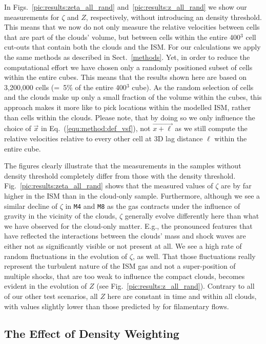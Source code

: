 In Figs.~\ref{pic:results:zeta_all_rand} and~\ref{pic:results:z_all_rand} we show our measurements for $\zeta$ and $Z$, respectively, without introducing an density threshold.
This means that we now do not only measure the relative velocities between cells that are part of the clouds' volume, but between cells within the entire 400$^3$ cell cut-outs that contain both the clouds and the ISM.
For our calculations we apply the same methods as described in Sect.~\ref{methods}. 
Yet, in order to reduce the computational effort we have chosen only a randomly positioned subset of cells within the entire cubes. 
This means that the results shown here are based on 3,200,000 cells (=~5\% of the entire 400$^3$ cube).
As the random selection of cells and the clouds make up only a small fraction of the volume within the cubes, this approach makes it more like to pick locations within the modelled ISM, rather than cells within the clouds. 
Please note, that by doing so we only influence the choice of $\vec{x}$ in Eq.~(\ref{equ:method:def_vsf}), not $\vec{x+\ell}$ as we still compute the relative velocities relative to every other cell at 3D lag distance $\ell$ within the entire cube. 

The figures clearly illustrate that the measurements in the samples without density threshold completely differ from those with the density threshold.
Fig.~\ref{pic:results:zeta_all_rand} shows that the measured values of $\zeta$ are by far higher in the ISM than in the cloud-only sample.
Furthermore, although we see a similar decline of $\zeta$ in \texttt{M4} and \texttt{M8} as the gas contracts under the influence of gravity in the vicinity of the clouds, $\zeta$ generally evolve differently here than what we have observed for the cloud-only matter.
E.g., the pronounced features that have reflected the interactions between the clouds' mass and shock waves are either not as significantly visible or not present at all.
We see a high rate of random fluctuations in the evolution of $\zeta$, as well.
That those fluctuations really represent the turbulent nature of the ISM gas and not a super-position of multiple shocks, that are too weak to influence the compact clouds, becomes evident in the evolution of $Z$ (see Fig.~\ref{pic:results:z_all_rand}). 
Contrary to all of our other test scenarios, all $Z$ here are constant in time and within all clouds, with values slightly lower than those predicted by \citet{She1994} for filamentary flows.


\subsection{The Effect of Density Weighting}\label{results:densweight}

